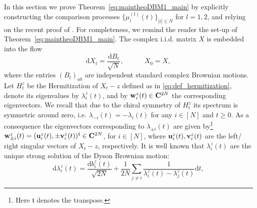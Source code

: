 \documentclass[10pt]{amsart}
\numberwithin{equation}{section}
\newcommand{\dif}{\mathrm{d}}
\newcommand{\C}{\mathbf{C}}
\begin{document}
In this section we prove Theorem~\ref{eq:maintheoDBM1_main} by explicitly constructing the comparison processes $\{\mu^{(l)}_i(t)\}_{|i|\le N}$ for $l=1,2$, and relying on the recent proof of \cite[Theorem~4.1]{bourgade2024fluctuations}. For completeness, we remind the reader the set-up of Theorem~\ref{eq:maintheoDBM1_main}. The complex i.i.d. matrix $X$ is embedded into the flow
\begin{equation}
\label{eq:matDBM1}
\dif X_t=\frac{\dif B_t}{\sqrt{N}}, \qquad\quad X_0=X,
\end{equation}
where the entries $(B_t)_{ab}$ are independent standard complex Brownian motions.
Let $H_t^z$ be the Hermitization of $X_t-z$ defined as in \eqref{eq:def_hermitization}, denote its eigenvalues by $\lambda_i^z(t)$, and by ${\bf w}_i^z(t)\in\C^{2N}$ the corresponding eigenvectors. We recall that due to the chiral symmetry of $H_t^z$ its spectrum is symmetric around zero, i.e. $\lambda_{-i}(t)=-\lambda_i(t)$ for any $i\in [N]$ and $t\ge 0$. As a consequence the eigenvectors corresponding to $\lambda_{\pm i}(t)$ are given by\footnote{Here $\mathfrak{t}$ denotes the transpose.} ${\bf w}_{\pm i}^z(t)=({\bf u}_i^z(t),\pm {\bf v}_i^z(t))^\mathfrak{t}\in\C^{2N}$, for $i\in [N]$, where ${\bf u}_i^z(t), {\bf v}_i^z(t)$ are the left/ right singular vectors of $X_t-z$, respectively. It is well known \cite[Eq.(5.8)]{loc_relax_flow} that $\lambda_i^z(t)$ are the unique strong solution of the Dyson Brownian motion: 
 \begin{equation}
\label{eq:DBM1}
\dif \lambda_i^z(t)=\frac{\dif b_i^z(t)}{\sqrt{2N}}+\frac{1}{2N}\sum_{j\ne i}\frac{1}{\lambda_i^z(t)-\lambda_j^z(t)}\dif t,
\end{equation}
\end{document}
